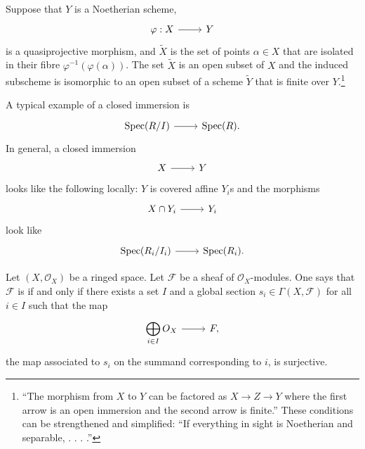 \documentclass [11 pt, oneside] {article}
\begin{document}
\begin{theorem}\label{mtdz}\text{}
Suppose that $Y$ is a Noetherian scheme, 
\[
\begin{tikzcd}
\varphi :X\ar[r]& Y
\end{tikzcd}
\]
is a quasiprojective morphism, and $\tilde X$ is the set of points $\alpha\in X$ that are isolated in their fibre $\varphi^{-1}(\varphi(\alpha))$. The set $\tilde X$ is an open subset of $X$ and the induced subscheme is isomorphic to an open subset of a scheme $\tilde Y$ that is finite over $Y$.\footnote{``The morphism from $X$ to $Y$
can be factored as $X\longrightarrow Z\longrightarrow Y$ where the first arrow is an open immersion and the second arrow is finite.'' These conditions can be strengthened and simplified: ``If everything in sight is Noetherian and separable, . . . .''}
\end{theorem}

A typical example of a closed immersion is 
\[
\begin{tikzcd}
\Spec(R/I)\ar[r]& \Spec(R).
\end{tikzcd}
\]
In general, a closed immersion
\[
\begin{tikzcd}
X\ar[r]& Y
\end{tikzcd}
\]
looks like the following locally: $Y$ is covered affine $Y_i$s and the morphisms 
\[
\begin{tikzcd}
X\cap Y_i\ar[r]& Y_i
\end{tikzcd}
\]
look like 
\[
\begin{tikzcd}
\Spec(R_i/I_i)\ar[r]& \Spec(R_i).
\end{tikzcd}
\]

\begin{definition}\label{gensec}\text{}
Let $(X,\mathscr{O}_X)$ be a ringed space. Let $\mathscr{F}$ be a sheaf of $\mathscr{O}_X$-modules. One says that $\mathscr{F}$ is  if and only if there exists a set $I$ and a global section $s_i\in \Gamma(X,\mathscr{F})$ for all $i\in I$ such that the map
\[
\begin{tikzcd}
\displaystyle\bigoplus_{i\in I}\mathscr{O}_X \ar[r]& \mathscr{F},
\end{tikzcd}
\]
the map associated to $s_i$ on the summand corresponding to $i$, is surjective.
\end{definition}
\end{document}
